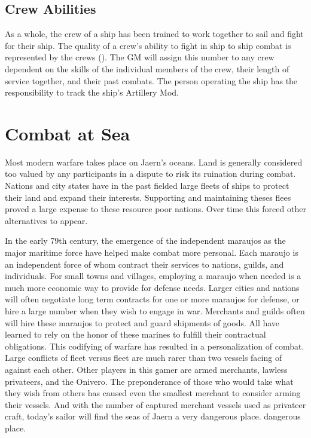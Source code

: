 \begin{multicols*}{2}
\subsection{Crew Abilities}
As a whole, the crew of a ship has been trained to work together to sail and fight for their ship. The quality of a crew's ability to fight in ship to ship combat is represented by
the crews  (\AM). The GM will assign this number to any crew dependent on the skills of the individual members of the crew, their length of service together, and their past combats. The person operating the ship has the responsibility to track the ship's Artillery Mod.
\section{Combat at Sea}
Most modern warfare takes place on Jaern's oceans. Land is generally considered too valued by any participants in a dispute to risk its ruination during combat. Nations and city
states have in the past fielded large fleets of ships to protect their land and expand their interests. Supporting and maintaining theses flees proved a large expense to these resource poor nations. Over time this forced other alternatives to appear.

In the early 79th century, the emergence of the independent maraujos as the major maritime force have helped make combat more personal. Each maraujo is an independent force of  whom contract their services to nations, guilds, and individuals. For small towns and villages, employing a maraujo when needed is a much more economic way to provide for defense needs. Larger cities and nations will often negotiate long term contracts for one or more maraujos for defense, or hire a large number when they wish to engage in war. Merchants and guilds often will hire these maraujos to protect and guard shipments of goods. All have learned to rely on the honor of these marines to fulfill their contractual obligations.
This codifying of warfare has resulted in a personalization of combat. Large conflicts of fleet versus fleet are much rarer than two vessels facing of against each other. Other players in this gamer are armed merchants, lawless privateers, and the Onivero. The preponderance of those who would take what they wish from others has caused even the smallest merchant to consider arming their vessels. And with the number of captured merchant vessels used as privateer craft, today's sailor will find the seas of Jaern a very dangerous place.
dangerous place.

\end{multicols*}
